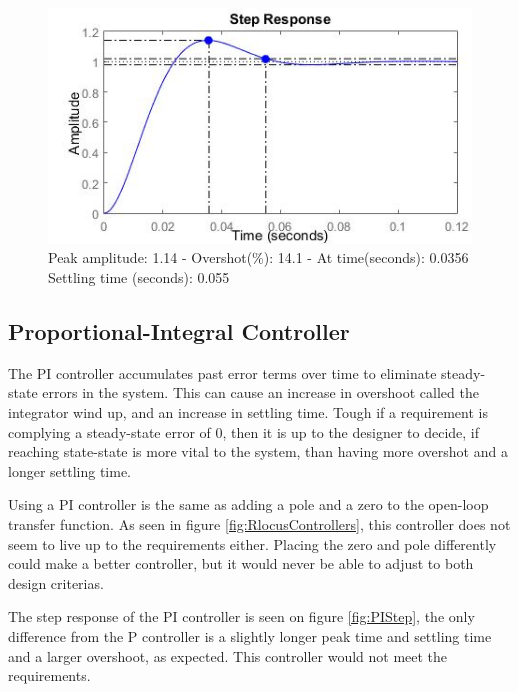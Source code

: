 \begin{figure}[h!]
\centering
\includegraphics[scale=0.7]{Billeder/PStep.jpg}
\caption{ Peak amplitude: 1.14 - Overshot(\%): 14.1 - At time(seconds): 0.0356
		 Settling time (seconds): 0.055 }
\label{fig:PStep}
\end{figure}

\subsection{Proportional-Integral Controller}

The PI controller accumulates past error terms over time to eliminate steady-state errors in the system. This can cause an increase in overshoot called the integrator wind up, and an increase in settling time. Tough if a requirement is complying a steady-state error of 0, then it is up to the designer to decide, if reaching state-state is more vital to the system, than having more overshot and a longer settling time.\par

Using a PI controller is the same as adding a pole and a zero to the open-loop transfer function. As seen in figure \ref{fig:RlocusControllers}, this controller does not seem to live up to the requirements either. Placing the zero and pole differently could make a better controller, but it would never be able to adjust to both design criterias.\par

The step response of the PI controller is seen on figure \ref{fig:PIStep}, the only difference from the P controller is a slightly longer peak time and settling time and a larger overshoot, as expected. This controller would not meet the requirements. 

